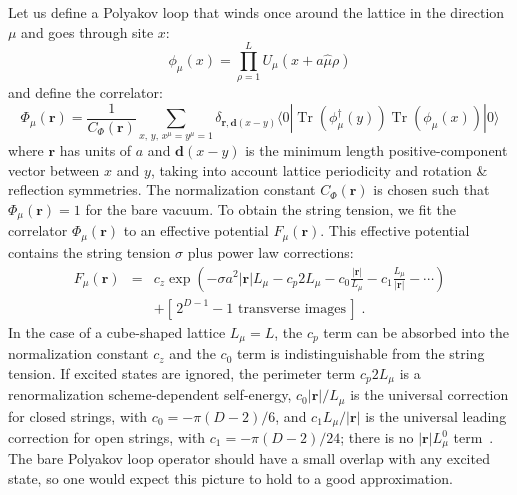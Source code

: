 \documentclass[preprint,aps,prd]{revtex4-2}
\newcommand{\be}{\begin{equation}}
\newcommand{\eq}{\end{equation}}
\DeclareMathOperator{\Tr}{Tr}
\newcommand{\cNorm}{c_z}
\begin{document}
Let us define a Polyakov loop that winds once around the lattice
in the direction $\mu$ and goes through site $x$:
\be
         \phi_\mu(x)= \prod_{\rho=1}^L U_\mu(x+a \hat{\mu} \rho)
\eq
and define the correlator:
\be
\Phi_\mu(\mathbf{r}) = \frac{1}{C_\Phi(\mathbf{r})} \sum_{x, \,y,\, x^\mu = y^\mu =1}
           \delta_{\mathbf{r},\mathbf{d}(x-y)}
           \langle 0 | \Tr\left(\phi_\mu^\dagger(y)\right)
            \Tr\left(\phi_\mu(x)\right) |0\rangle
           \label{pcorr}
\eq
%
where $\mathbf{r}$ has units of $a$ and
$\mathbf{d}(x-y)$ is the minimum length positive-component
vector between $x$ and $y$, taking into account lattice periodicity
and rotation \& reflection symmetries.
The normalization constant $C_\Phi(\mathbf{r})$ is chosen such that
$\Phi_\mu(\mathbf{r})=1$ for the bare vacuum.
To obtain the string tension,
we fit the correlator $\Phi_\mu(\mathbf{r})$ to an effective
potential $F_\mu(\mathbf{r})$.
This effective potential contains the string tension $\sigma$
plus power law corrections:
%
\begin{eqnarray}
         F_\mu(\mathbf{r}) &=&  \cNorm \exp\left(
         -\sigma a^2 \left|\mathbf{r}\right| L_\mu
         - c_p 2 L_\mu 
         - c_0 \frac{\left|\mathbf{r}\right|}{L_\mu}
         - c_1 \frac{L_\mu}{\left|\mathbf{r}\right|}
         - \cdots \right)\nonumber\\
         & & + \left[\,\mbox{$2^{D-1}-1$ transverse images}\,\right]
         \; .  \label{stringmodel}
\end{eqnarray}
%
In the case of a cube-shaped lattice $L_\mu = L$, the $c_p$ term can
be absorbed into the normalization constant $\cNorm$ and
the $c_0$ term is indistinguishable from the string tension.
If excited states are ignored, the perimeter term $c_p 2 L_\mu$ is a
renormalization scheme-dependent self-energy,
$c_0 \left|\mathbf{r}\right|/L_\mu$ is the universal correction
for closed strings, with $c_0 = -\pi (D-2)/6$, and
$c_1 L_\mu/\left|\mathbf{r}\right|$ is the universal leading correction
for open strings, with $c_1 = -\pi (D-2)/24$; there is no
$\left|\mathbf{r}\right| L_\mu^0$
term~\cite{luscher_anomalies_1980,luscher_quark_2002,aharony_effective_2013}.
The bare Polyakov loop operator should have a small overlap with
any excited state, so one would expect this picture to hold to a
good approximation.
\end{document}
